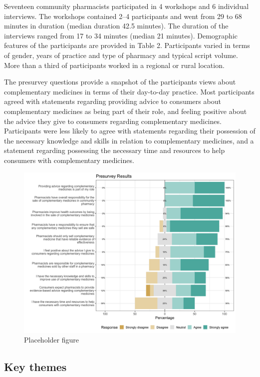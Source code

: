 \documentclass[11pt,a4paper]{article}
\begin{document}
Seventeen community pharmacists participated in 4 workshops and 6
individual interviews. The workshops contained 2--4 participants and
went from 29 to 68 minutes in duration (median duration 42.5 minutes).
The duration of the interviews ranged from 17 to 34 minutes (median 21
minutes). Demographic features of the participants are provided in Table
2. Participants varied in terms of gender, years of practice and type of
pharmacy and typical script volume. More than a third of participants
worked in a regional or rural location.



The presurvey questions provide a snapshot of the participants views
about complementary medicines in terms of their day-to-day practice.
Most participants agreed with statements regarding providing advice to
consumers about complementary medicines as being part of their role, and
feeling positive about the advice they give to consumers regarding
complementary medicines. Participants were less likely to agree with
statements regarding their possession of the necessary knowledge and
skills in relation to complementary medicines, and a statement regarding
possessing the necessary time and resources to help consumers with
complementary medicines.

\begin{figure}
\centering
\includegraphics{fig_tab/presurvey.png}
\caption{Placeholder figure}
\end{figure}

\subsection{Key themes}\label{key-themes}
\end{document}

